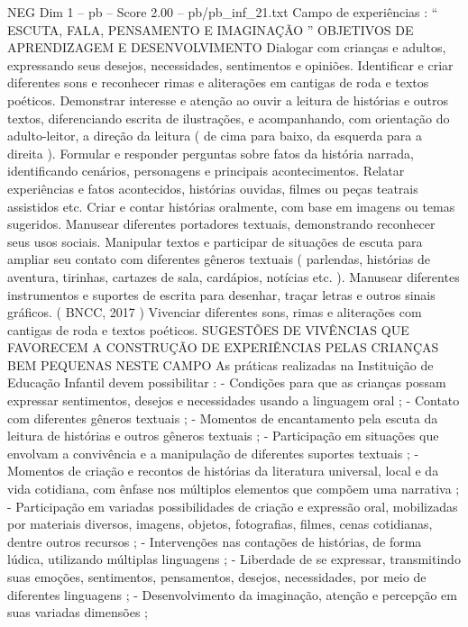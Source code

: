 \begin{textsample}{NEG Dim 1 – pb – Score 2.00 – pb/pb\_inf\_21.txt}  \label{ex:f1_neg_147}
Campo de experiências : “ ESCUTA, FALA, PENSAMENTO E IMAGINAÇÃO ” OBJETIVOS DE APRENDIZAGEM E DESENVOLVIMENTO Dialogar com crianças e adultos, expressando seus desejos, necessidades, sentimentos e opiniões.
Identificar e criar diferentes sons e reconhecer rimas e aliterações em cantigas de roda e textos poéticos.
Demonstrar interesse e atenção ao ouvir a leitura de histórias e outros textos, diferenciando escrita de ilustrações, e acompanhando, com orientação do adulto-leitor, a direção da leitura ( de cima para baixo, da esquerda para a direita ).
Formular e responder perguntas sobre fatos da história narrada, identificando cenários, personagens e principais acontecimentos.
Relatar experiências e fatos acontecidos, histórias ouvidas, filmes ou peças teatrais assistidos etc.
Criar e contar histórias oralmente, com base em imagens ou temas sugeridos.
Manusear diferentes portadores textuais, demonstrando reconhecer seus usos sociais.
Manipular textos e participar de situações de escuta para ampliar seu contato com diferentes gêneros textuais ( parlendas, histórias de aventura, tirinhas, cartazes de sala, cardápios, notícias etc. ).
Manusear diferentes instrumentos e suportes de escrita para desenhar, traçar letras e outros sinais gráficos. ( BNCC, 2017 ) Vivenciar diferentes sons, rimas e aliterações com cantigas de roda e textos poéticos.
SUGESTÕES DE VIVÊNCIAS QUE FAVORECEM A CONSTRUÇÃO DE EXPERIÊNCIAS PELAS CRIANÇAS BEM PEQUENAS NESTE CAMPO As práticas realizadas na Instituição de Educação Infantil devem possibilitar : - Condições para que as crianças possam expressar sentimentos, desejos e necessidades usando a linguagem oral ; - Contato com diferentes gêneros textuais ; - Momentos de encantamento pela escuta da leitura de histórias e outros gêneros textuais ; - Participação em situações que envolvam a convivência e a manipulação de diferentes suportes textuais ; - Momentos de criação e recontos de histórias da literatura universal, local e da vida cotidiana, com ênfase nos múltiplos elementos que compõem uma narrativa ; - Participação em variadas possibilidades de criação e expressão oral, mobilizadas por materiais diversos, imagens, objetos, fotografias, filmes, cenas cotidianas, dentre outros recursos ; - Intervenções nas contações de histórias, de forma lúdica, utilizando múltiplas linguagens ; - Liberdade de se expressar, transmitindo suas emoções, sentimentos, pensamentos, desejos, necessidades, por meio de diferentes linguagens ; - Desenvolvimento da imaginação, atenção e percepção em suas variadas dimensões ;

\end{textsample}
